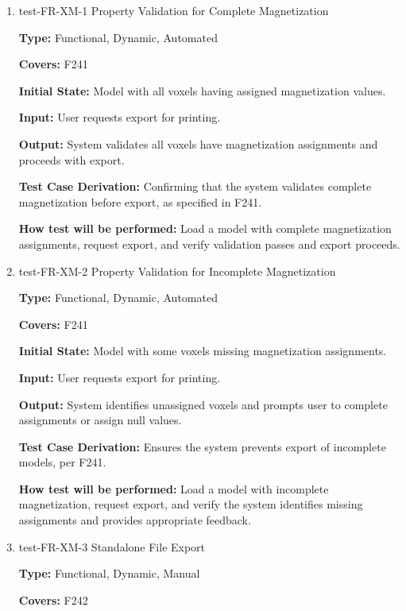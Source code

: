 \documentclass[12pt, titlepage]{article}
\begin{document}
\begin{enumerate}

\item{test-FR-XM-1 Property Validation for Complete Magnetization\\}

\textbf{Type:} Functional, Dynamic, Automated

\textbf{Covers:} F241
					
\textbf{Initial State:} Model with all voxels having assigned magnetization values.
					
\textbf{Input:} User requests export for printing.
					
\textbf{Output:} System validates all voxels have magnetization assignments and proceeds with export.

\textbf{Test Case Derivation:} Confirming that the system validates complete magnetization before export, as specified in F241.
					
\textbf{How test will be performed:} Load a model with complete magnetization assignments, request export, and verify validation passes and export proceeds.

\item{test-FR-XM-2 Property Validation for Incomplete Magnetization\\}

\textbf{Type:} Functional, Dynamic, Automated

\textbf{Covers:} F241
					
\textbf{Initial State:} Model with some voxels missing magnetization assignments.
					
\textbf{Input:} User requests export for printing.
					
\textbf{Output:} System identifies unassigned voxels and prompts user to complete assignments or assign null values.

\textbf{Test Case Derivation:} Ensures the system prevents export of incomplete models, per F241.
					
\textbf{How test will be performed:} Load a model with incomplete magnetization, request export, and verify the system identifies missing assignments and provides appropriate feedback.

\item{test-FR-XM-3 Standalone File Export\\}

\textbf{Type:} Functional, Dynamic, Manual

\textbf{Covers:} F242
					

\end{enumerate}
\end{document}
